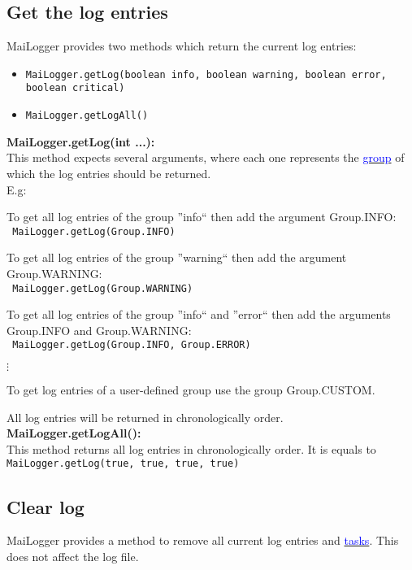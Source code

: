 \documentclass{article}
\newcommand{\refh}[2]{\hyperref[#1] {\textcolor{blue}{#2}}}
\newcommand{\tab}[1][1]{\hspace*{#1cm}}
\begin{document}
    \subsection{Get the log entries}
    \label{other_getlog}
    MaiLogger provides two methods which return the current log entries:
    \begin{itemize}
        \item \lstinline|MaiLogger.getLog(boolean info, boolean warning, boolean error, boolean critical)|
        \item \lstinline|MaiLogger.getLogAll()|
    \end{itemize}

    \textbf{MaiLogger.getLog(int ...):} \\
    This method expects several arguments, where each one represents the \refh{logging_groups}{group} of which the log entries should be returned. \\
    E.g:
    \begin{description}
        \item To get all log entries of the group ''info`` then add the argument Group.INFO: \\ \lstinline| MaiLogger.getLog(Group.INFO)|
        \item To get all log entries of the group ''warning`` then add the argument Group.WARNING: \\ \lstinline| MaiLogger.getLog(Group.WARNING)|
        \item To get all log entries of the group ''info`` and ''error`` then add the arguments Group.INFO and Group.WARNING: \\ \lstinline| MaiLogger.getLog(Group.INFO, Group.ERROR)|
        \item \tab[5] $\vdots$
    \end{description}

	To get log entries of a user-defined group use the group Group.CUSTOM.

    All log entries will be returned in chronologically order. \\

    \textbf{MaiLogger.getLogAll():} \\
    This method returns all log entries in chronologically order.
    It is equals to \lstinline|MaiLogger.getLog(true, true, true, true)|

    \subsection{Clear log}
    \label{other_clear}
    MaiLogger provides a method to remove all current log entries and \refh{tasks}{tasks}.
    This does not affect the log file.
\end{document}
